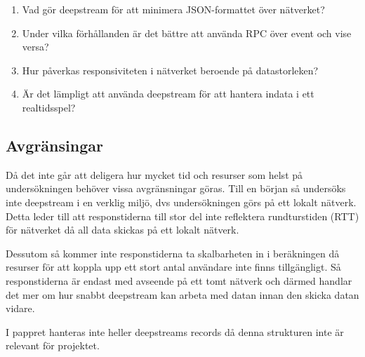 \begin{enumerate}

\item Vad gör deepstream för att minimera JSON-formattet över nätverket?

\item Under vilka förhållanden är det bättre att använda RPC över event och vise versa?

\item Hur påverkas responsiviteten i nätverket beroende på datastorleken?  

\item Är det lämpligt att använda deepstream för att hantera indata i ett realtidsspel?

\end{enumerate}

\subsection{Avgränsingar}
\label{subsec:tim-delimitations}
Då det inte går att deligera hur mycket tid och resurser som helst på undersökningen behöver vissa avgränsningar göras. Till en början så undersöks inte deepstream i en verklig miljö, dvs undersökningen görs på ett lokalt nätverk. Detta leder till att responstiderna till stor del inte reflektera rundturstiden (RTT) för nätverket då all data skickas på ett lokalt nätverk.

Dessutom så kommer inte responstiderna ta skalbarheten in i beräkningen då resurser för att koppla upp ett stort antal användare inte finns tillgängligt. Så responstiderna är endast med avseende på ett tomt nätverk och därmed handlar det mer om hur snabbt deepstream kan arbeta med datan innan den skicka datan vidare.

I pappret hanteras inte heller deepstreams records då denna strukturen inte är relevant för projektet.
